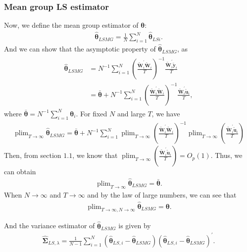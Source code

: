 \documentclass[12pt,a4paper,hyperref]{article}
\DeclareMathOperator*{\plim}{plim}
\begin{document}
\subsubsection{Mean group LS estimator }
Now, we define the mean group estimator of $\boldsymbol{\theta}$:
\begin{align}
\hat{\boldsymbol{\theta}}_{LSMG}=\frac{1}{N}\sum^{N}_{i=1}\hat{\boldsymbol{\theta}}_{LSi}.
\end{align}
And we can show that the asymptotic property of $\hat{\boldsymbol{\theta}}_{LSMG}$, as
\begin{align}
\begin{split}
\hat{\boldsymbol{\theta}}_{LSMG}&=N^{-1}\sum^{N}_{i=1}\left(\frac{\tilde{\boldsymbol{W}}^{'}_{i} \tilde{\boldsymbol{W}}_{i}}{T}  \right)^{-1} \frac{ \tilde{\boldsymbol{W}}^{'}_{i}\tilde{\boldsymbol{y}}_{i}}{T} \\
&=\bar{\boldsymbol{\theta}}+N^{-1}\sum^{N}_{i=1}\left(\frac{\tilde{\boldsymbol{W}}^{'}_{i} \tilde{\boldsymbol{W}}_{i}}{T}  \right)^{-1} \frac{ \tilde{\boldsymbol{W}}^{'}_{i}\tilde{\boldsymbol{u}}_{i}}{T},
\end{split}
\end{align}
where $\bar{\boldsymbol{\theta}}=N^{-1}\sum^{N}_{i=1}\boldsymbol{\theta}_{i}.$
For fixed $N$ and large $T$, we have
\begin{align}
\plim_{T \to \infty}\hat{\boldsymbol{\theta}}_{LSMG} =  \bar{\boldsymbol{\theta}}+ N^{-1}\sum^{N}_{i=1}\plim_{T \to \infty}\left(\frac{\tilde{\boldsymbol{W}}^{'}_{i} \tilde{\boldsymbol{W}}_{i}}{T}  \right)^{-1}\plim_{T \to \infty}\left( \frac{ \tilde{\boldsymbol{W}}^{'}_{i}\tilde{\boldsymbol{u}}_{i}}{T}\right)
\end{align}
 Then, from section $1.1$, we know that $\plim_{T \to \infty}\left( \frac{ \tilde{\boldsymbol{W}}^{'}_{i}\tilde{\boldsymbol{u}}_{i}}{T}\right)=O_{p}(1)$. Thus,  we can obtain
\begin{align}
\plim_{T \to \infty}\hat{\boldsymbol{\theta}}_{LSMG} =  \bar{\boldsymbol{\theta}}.
\end{align}
When $N \to \infty$ and $T \to \infty$ and by the law of large numbers, we can see that
\begin{align}
\plim_{T \to \infty, N \to \infty}\hat{\boldsymbol{\theta}}_{LSMG}=\boldsymbol{\theta}.
\end{align}

And the variance estimator of $\hat{\boldsymbol{\theta}}_{LSMG}$ is given by
\begin{align}
\hat{\boldsymbol{\Sigma}}_{LS,\lambda}=\frac{1}{N-1}\sum^{N}_{i=1}\left( \hat{\boldsymbol{\theta}}_{LS,i}- \hat{\boldsymbol{\theta}}_{LSMG}\right)\left( \hat{\boldsymbol{\theta}}_{LS,i}- \hat{\boldsymbol{\theta}}_{LSMG}\right)^{'}.
\end{align}
\end{document}
